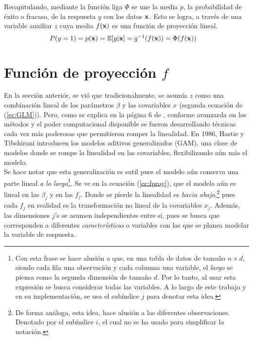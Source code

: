 \documentclass[../Main/Main.tex]{subfiles}
\begin{document}
Recapitulando, mediante la función liga $\Phi$ se une la media $p$, la probabilidad de éxito o fracaso, de la respuesta $y$ con los datos $\mathbf{x}$. Esto se logra, a través de una variable auxiliar $z$ cuya media $f(\mathbf{x})$ es una función de proyección lineal. 
\begin{align} \label{ec:RegMedia}
	P(y = 1) = p(\mathbf{x}) &=\mathbb{E}[y|\mathbf{x}] = g^{-1}(f(\mathbf{x})) = \Phi(f(\mathbf{x}))
\end{align}

\section{Función de proyección $f$} \label{sec:FuncProy} 
En la sección anteriór, se vió que tradicionalmente, se asumía $z$ como una combinación lineal de los parámetros $\beta$ y las covariables $x$ (segunda ecuación de (\ref{ec:GLM})). Pero, como se explica en la página 6 de \autocite{james2013introduction}, conforme avanzarda on los métodos y el poder computacional disponible se fueron desarrollando técnicas cada vez más poderosas que permitieron romper la linealidad. En 1986, Hastie y Tibshirani introducen los modelos aditivos generalizados (GAM), una clase de modelos donde se rompe la linealidad en las covariables, flexibilizando aún más el  modelo.\\

Se hace notar que esta generalización es sutil pues el modelo aún conserva una parte lineal \textit{a lo largo}\footnote{Con esta frase se hace alusión a que, en una tabla de datos de tamaño $n \times d$, siendo cada fila una observación y cada columna una variable, el \textit{largo} se piensa como la segunda dimensión de tamaño $d$. Por lo tanto, al usar esta expresión se busca considerar todas las variables. A lo largo de este trabajo y en su implementación, se usa el subíndice $j$ para denotar esta idea.}. Se ve en la ecuación (\ref{ec:fproy}), que el modelo aún es lineal en las $\beta_j$ y en las $f_j$. Donde se pierde la linealidad es \textit{hacia abajo},\footnote{De forma análoga, esta idea, hace alusión a las diferentes observaciones. Denotado por el subíndice $i$, el cual no se ha usado para simplificar la notación.} pues cada $f_j$ en realidad es la transformación no lineal de la covariables $x_j$. Además, las dimensiones $j$'s se asumen independientes entre si, pues se busca que corresponden a diferentes \textit{características} o variables con las que se planea modelar la variable de respuesta.\\
\end{document}
